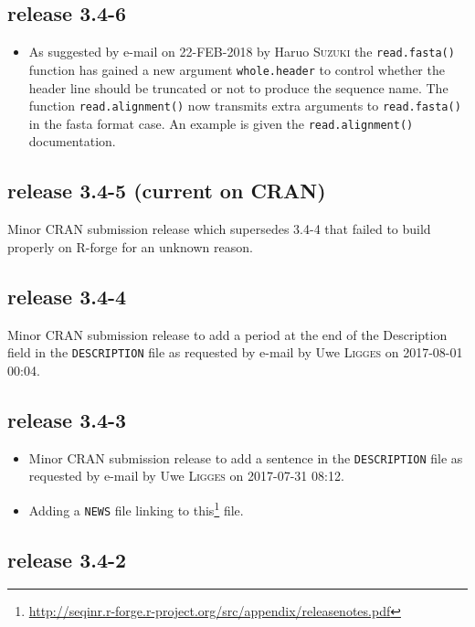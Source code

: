 \documentclass{article}
\begin{document}
\subsection*{release 3.4-6}

\begin{itemize}

\item As suggested by e-mail on 22-FEB-2018 by Haruo \textsc{Suzuki} the \texttt{read.fasta()} function has gained a new argument \texttt{whole.header} to control whether the header line should be truncated or not to produce the sequence name. The function \texttt{read.alignment()} now transmits extra arguments to \texttt{read.fasta()} in the fasta format case. An example is given the \texttt{read.alignment()} documentation.


\end{itemize}

\subsection*{release 3.4-5 (current on CRAN)}

Minor CRAN submission release which supersedes 3.4-4 that failed to
build properly on R-forge for an unknown reason.

\subsection*{release 3.4-4}

Minor CRAN submission release to add a period at the end of the Description field in the \texttt{DESCRIPTION} file as requested by e-mail by Uwe \textsc{Ligges} on 2017-08-01 00:04.

\subsection*{release 3.4-3}

\begin{itemize}
\item Minor CRAN submission release to add a sentence in the \texttt{DESCRIPTION} file as requested by e-mail by Uwe \textsc{Ligges} on 2017-07-31 08:12.

\item Adding a \texttt{NEWS} file linking to this\footnote{%
\url{http://seqinr.r-forge.r-project.org/src/appendix/releasenotes.pdf}} file.
\end{itemize}

\subsection*{release 3.4-2}
\end{document}
